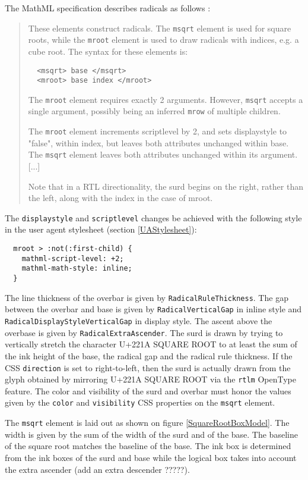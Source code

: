 The MathML specification describes radicals as follows \cite{MathML3}:
%
\begin{quote}
These elements construct radicals. The {\tt msqrt} element is used for square
roots, while the {\tt mroot} element is used to draw radicals with indices,
e.g. a cube root. The syntax for these elements is:
%
\begin{lstlisting}
  <msqrt> base </msqrt>
  <mroot> base index </mroot>
\end{lstlisting}
%
The {\tt mroot} element requires exactly 2 arguments. However, {\tt msqrt}
accepts a single argument, possibly being an inferred {\tt mrow} of multiple
children.

The {\tt mroot} element increments scriptlevel by 2, and sets displaystyle to
"false", within index, but leaves both attributes unchanged within base. The
{\tt msqrt} element leaves both attributes unchanged within its argument. [...]

Note that in a RTL directionality, the surd begins on the right, rather than
the left, along with the index in the case of mroot.
\end{quote}

The {\tt displaystyle} and {\tt scriptlevel} changes be achieved with the
following style in the user agent stylesheet (section \ref{UAStylesheet}):
%
\begin{lstlisting}
  mroot > :not(:first-child) {
    mathml-script-level: +2;
    mathml-math-style: inline;
  }
\end{lstlisting}

The line thickness of the overbar is given by {\tt RadicalRuleThickness}.
The gap between the overbar and base is given by {\tt RadicalVerticalGap}
in inline style and {\tt RadicalDisplayStyleVerticalGap} in display style.
The ascent above the overbase is given by {\tt RadicalExtraAscender}. The
surd is drawn by trying to vertically stretch the character U+221A SQUARE ROOT
to at least the sum of the ink height of the base, the radical gap and the
radical rule thickness. If the CSS {\tt direction} is set to right-to-left,
then the surd is actually drawn from the glyph obtained by mirroring
U+221A SQUARE ROOT via the {\tt rtlm} OpenType feature.
The color and visibility of the surd and overbar must honor the values given by
the {\tt color} and {\tt visibility} CSS properties on the {\tt msqrt} element.

The {\tt msqrt} element is laid out as shown on figure \ref{SquareRootBoxModel}.
The width is given by the sum of the width of the surd and of the base.
The baseline of the square root matches the baseline of the base.
The ink box is determined from the ink boxes of the surd and base while the
logical box takes into account the extra ascender
(add an extra descender ?????).

